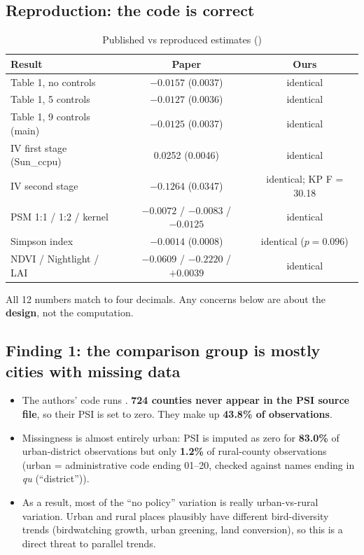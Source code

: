 \documentclass[11pt]{article}
\begin{document}
\subsection{Reproduction: the code is correct}
\begin{table}[H]\centering\small
\caption{Published vs reproduced estimates ()}
\begin{tabular}{lcc}
\toprule
Result & Paper & Ours\\
\midrule
Table 1, no controls & $-0.0157$ (0.0037) & identical\\
Table 1, 5 controls & $-0.0127$ (0.0036) & identical\\
Table 1, 9 controls (main) & $-0.0125$ (0.0037) & identical\\
IV first stage (Sun\_ccpu) & 0.0252 (0.0046) & identical\\
IV second stage & $-0.1264$ (0.0347) & identical; KP F = 30.18\\
PSM 1:1 / 1:2 / kernel & $-0.0072$ / $-0.0083$ / $-0.0125$ & identical\\
Simpson index & $-0.0014$ (0.0008) & identical ($p=0.096$)\\
NDVI / Nightlight / LAI & $-0.0609$ / $-0.2220$ / $+0.0039$ & identical\\
\bottomrule
\end{tabular}
\end{table}
All 12 numbers match to four decimals. Any concerns below are about the \textbf{design}, not the computation.

\subsection{Finding 1: the comparison group is mostly cities with missing data}
\begin{itemize}
\item The authors' code runs . \textbf{724 counties never appear in the PSI source file}, so their PSI is set to zero. They make up \textbf{43.8\% of observations}.
\item Missingness is almost entirely urban: PSI is imputed as zero for \textbf{83.0\%} of urban-district observations but only \textbf{1.2\%} of rural-county observations (urban = administrative code ending 01--20, checked against names ending in \textit{qu} (``district'')).
\item As a result, most of the ``no policy'' variation is really urban-vs-rural variation. Urban and rural places plausibly have different bird-diversity trends (birdwatching growth, urban greening, land conversion), so this is a direct threat to parallel trends.
\end{itemize}
\end{document}
